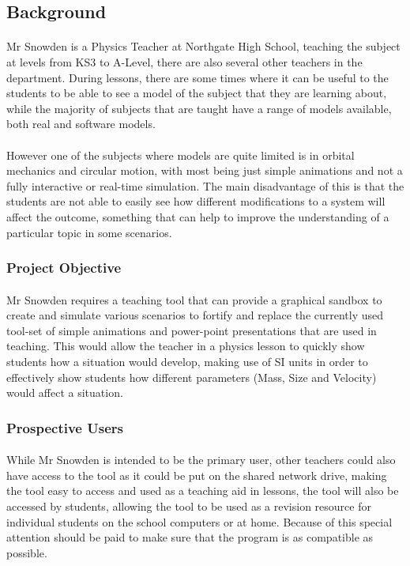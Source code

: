 \subsection{Background}
\paragraph{} 
Mr Snowden is a Physics Teacher at Northgate High School, teaching the subject at levels from KS3 to A-Level, there are also several other teachers in the department. During lessons, there are some times where it can be useful to the students to be able to see a model of the subject that they are learning about, while the majority of subjects that are taught have a range of models available, both real and software models.

\paragraph{} 
However one of the subjects where models are quite limited is in orbital mechanics and circular motion, with most being just simple animations and not a fully interactive or real-time simulation. The main disadvantage of this is that the students are not able to easily see how different modifications to a system will affect the outcome, something that can help to improve the understanding of a particular topic in some scenarios.

\subsubsection{Project Objective}
\paragraph{}
Mr Snowden requires a teaching tool that can provide a graphical sandbox to create and simulate various scenarios to fortify and replace the currently used tool-set of simple animations and power-point presentations that are used in teaching. This would allow the teacher in a physics lesson to quickly show students how a situation would develop, making use of SI units in order to effectively show students how different parameters (Mass, Size and Velocity) would affect a situation.

\subsubsection{Prospective Users}
\paragraph{}
While Mr Snowden is intended to be the primary user, other teachers could also have access to the tool as it could be put on the shared network drive, making the tool easy to access and used as a teaching aid in lessons, the tool will also be accessed by students, allowing the tool to be used as a revision resource for individual students on the school computers or at home. Because of this special attention should be paid to make sure that the program is as compatible as possible. 

